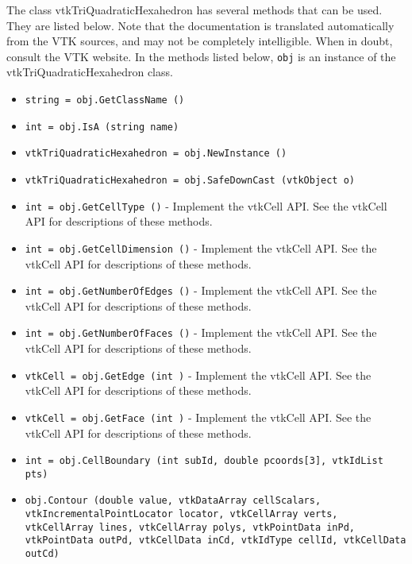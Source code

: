 The class vtkTriQuadraticHexahedron has several methods that can be used.
  They are listed below.
Note that the documentation is translated automatically from the VTK sources,
and may not be completely intelligible.  When in doubt, consult the VTK website.
In the methods listed below, \verb|obj| is an instance of the vtkTriQuadraticHexahedron class.
\begin{itemize}
\item  \verb|string = obj.GetClassName ()|

\item  \verb|int = obj.IsA (string name)|

\item  \verb|vtkTriQuadraticHexahedron = obj.NewInstance ()|

\item  \verb|vtkTriQuadraticHexahedron = obj.SafeDownCast (vtkObject o)|

\item  \verb|int = obj.GetCellType ()| -  Implement the vtkCell API. See the vtkCell API for descriptions
 of these methods.

\item  \verb|int = obj.GetCellDimension ()| -  Implement the vtkCell API. See the vtkCell API for descriptions
 of these methods.

\item  \verb|int = obj.GetNumberOfEdges ()| -  Implement the vtkCell API. See the vtkCell API for descriptions
 of these methods.

\item  \verb|int = obj.GetNumberOfFaces ()| -  Implement the vtkCell API. See the vtkCell API for descriptions
 of these methods.

\item  \verb|vtkCell = obj.GetEdge (int )| -  Implement the vtkCell API. See the vtkCell API for descriptions
 of these methods.

\item  \verb|vtkCell = obj.GetFace (int )| -  Implement the vtkCell API. See the vtkCell API for descriptions
 of these methods.

\item  \verb|int = obj.CellBoundary (int subId, double pcoords[3], vtkIdList pts)|

\item  \verb|obj.Contour (double value, vtkDataArray cellScalars, vtkIncrementalPointLocator locator, vtkCellArray verts, vtkCellArray lines, vtkCellArray polys, vtkPointData inPd, vtkPointData outPd, vtkCellData inCd, vtkIdType cellId, vtkCellData outCd)|


\end{itemize}
